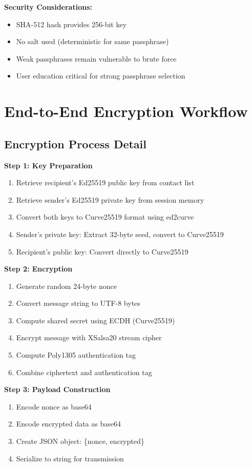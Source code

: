 \textbf{Security Considerations:}
\begin{itemize}
    \item SHA-512 hash provides 256-bit key
    \item No salt used (deterministic for same passphrase)
    \item Weak passphrases remain vulnerable to brute force
    \item User education critical for strong passphrase selection
\end{itemize}

\section{End-to-End Encryption Workflow}

\subsection{Encryption Process Detail}

\textbf{Step 1: Key Preparation}
\begin{enumerate}
    \item Retrieve recipient's Ed25519 public key from contact list
    \item Retrieve sender's Ed25519 private key from session memory
    \item Convert both keys to Curve25519 format using ed2curve
    \item Sender's private key: Extract 32-byte seed, convert to Curve25519
    \item Recipient's public key: Convert directly to Curve25519
\end{enumerate}

\textbf{Step 2: Encryption}
\begin{enumerate}
    \item Generate random 24-byte nonce
    \item Convert message string to UTF-8 bytes
    \item Compute shared secret using ECDH (Curve25519)
    \item Encrypt message with XSalsa20 stream cipher
    \item Compute Poly1305 authentication tag
    \item Combine ciphertext and authentication tag
\end{enumerate}

\textbf{Step 3: Payload Construction}
\begin{enumerate}
    \item Encode nonce as base64
    \item Encode encrypted data as base64
    \item Create JSON object: \{nonce, encrypted\}
    \item Serialize to string for transmission
\end{enumerate}

